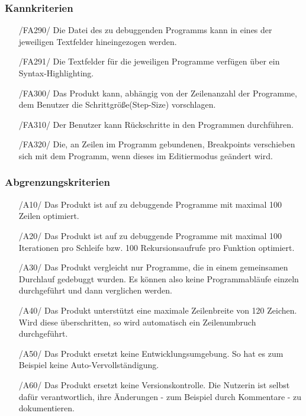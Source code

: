 \documentclass[parskip=full]{scrartcl}
\begin{document}
 		\subsubsection{Kannkriterien}
		\begin{itemize}
		\item[/FA290/] Die Datei des zu debuggenden Programms kann in eines der jeweiligen Textfelder hineingezogen werden.
		\item[/FA291/] Die Textfelder für die jeweiligen Programme verfügen über ein Syntax-Highlighting.
		\item[/FA300/] Das Produkt kann, abhängig von der Zeilenanzahl der Programme, dem Benutzer die Schrittgröße(Step-Size) vorschlagen.
		\item[/FA310/] Der Benutzer kann Rückschritte in den Programmen durchführen.
		\item[/FA320/] Die, an Zeilen im Programm gebundenen, \glspl{Breakpoint} verschieben sich mit dem Programm, wenn dieses im \gls{Editiermodus} geändert wird.
		\end{itemize}		 		
 		
 		
 		\subsubsection{Abgrenzungskriterien}
 		\begin{itemize}
 		\item[/A10/] Das Produkt ist auf zu debuggende Programme mit maximal 100 Zeilen optimiert.
 		\item[/A20/] Das Produkt ist auf zu debuggende Programme mit maximal 100 Iterationen pro Schleife bzw. 100 Rekursionsaufrufe pro Funktion optimiert.
 		\item[/A30/] Das Produkt vergleicht nur Programme, die in einem gemeinsamen Durchlauf gedebuggt wurden. Es können also keine Programmabläufe einzeln durchgeführt und dann verglichen werden. %
 		\item[/A40/] Das Produkt unterstützt eine maximale Zeilenbreite von 120 Zeichen. Wird diese überschritten, so wird automatisch ein Zeilenumbruch durchgeführt.
 		\item[/A50/] Das Produkt ersetzt keine Entwicklungsumgebung. So hat es zum Beispiel keine Auto-Vervollständigung.
 		\item[/A60/] Das Produkt ersetzt keine Versionskontrolle. Die Nutzerin ist selbst dafür verantwortlich, ihre Änderungen - zum Beispiel durch Kommentare - zu dokumentieren.
 		\end{itemize}
 		
\end{document}
